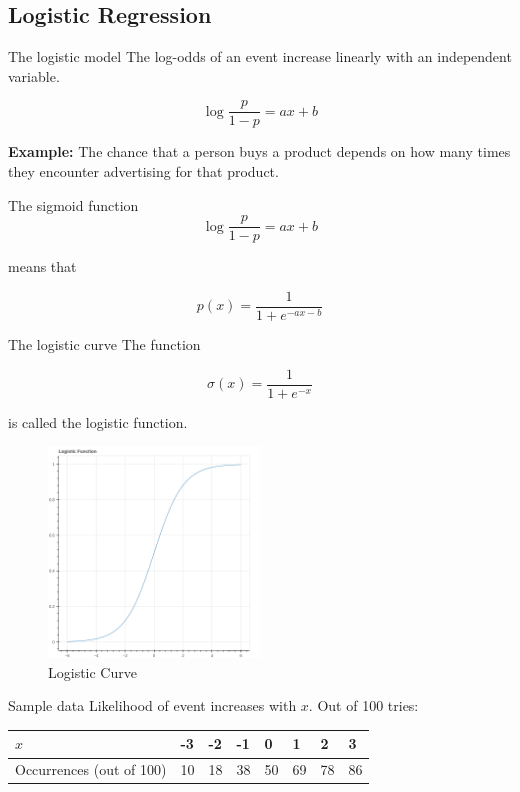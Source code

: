\documentclass[
  ignorenonframetext,
]{beamer}
\author{}
\date{}
\begin{document}
\hypertarget{logistic-regression}{%
\subsection{Logistic Regression}\label{logistic-regression}}

\begin{frame}{The logistic model}
\protect\hypertarget{the-logistic-model}{}
The log-odds of an event increase linearly with an independent variable.

\[
\log\frac{p}{1-p} = ax+b
\]

\textbf{Example:} The chance that a person buys a product depends on how
many times they encounter advertising for that product.
\end{frame}

\begin{frame}{The sigmoid function}
\protect\hypertarget{the-sigmoid-function}{}
\[
\log\frac{p}{1-p}=ax+b
\]

means that

\[
p(x)=\frac{1}{1+e^{-ax-b}}
\]
\end{frame}

\begin{frame}{The logistic curve}
\protect\hypertarget{the-logistic-curve}{}
The function

\[
\sigma(x)=\frac{1}{1+e^{-x}}
\]

is called the logistic function.

\begin{figure}
\centering
\includegraphics[width=0.5\textwidth,height=\textheight]{logistic_curve.png}
\caption{Logistic Curve}
\end{figure}
\end{frame}

\begin{frame}{Sample data}
\protect\hypertarget{sample-data}{}
Likelihood of event increases with \(x\). Out of 100 tries:

\begin{longtable}[]{@{}llllllll@{}}
\toprule()
\(x\) & -3 & -2 & -1 & 0 & 1 & 2 & 3 \\
\midrule()
\endhead
Occurrences (out of 100) & 10 & 18 & 38 & 50 & 69 & 78 & 86 \\
\bottomrule()
\end{longtable}
\end{frame}
\end{document}
